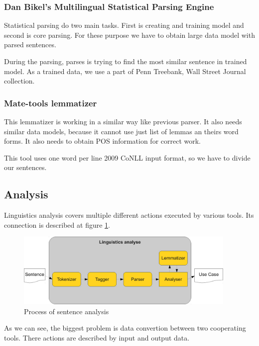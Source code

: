\subsubsection{Dan Bikel's Multilingual Statistical Parsing Engine}   

Statistical parsing do two main tasks. First is creating and training model and second is core parsing. For these purpose we have to obtain large data model with parsed sentences. 

During the parsing, parses is trying to find the most similar sentence in trained model. As a trained data, we use a part of Penn Treebank, Wall Street Journal collection.

\subsubsection{Mate-tools lemmatizer}          
          
This lemmatizer is working in a similar way like previous parser. It also needs similar data models, because it cannot use just list of lemmas an theirs word forms. It also needs to obtain POS information for correct work.

This tool uses one word per line 2009 CoNLL  input format, so we have to divide our sentences.

\subsection{Analysis}
\label{sec:analysis}
Linguistics analysis covers multiple different actions executed by various tools. Its connection is described at figure \ref{fig:LinguisticsAnalyse}. 

\begin{figure}[ht]
  \centering
  \includegraphics[width=300pt]{images/LinguisticsAnalyse}
  \caption{Process of sentence analysis}
  \label{fig:LinguisticsAnalyse}
\end{figure}

As we can see, the biggest problem is data convertion between two cooperating tools. There actions are described by input and output data.

